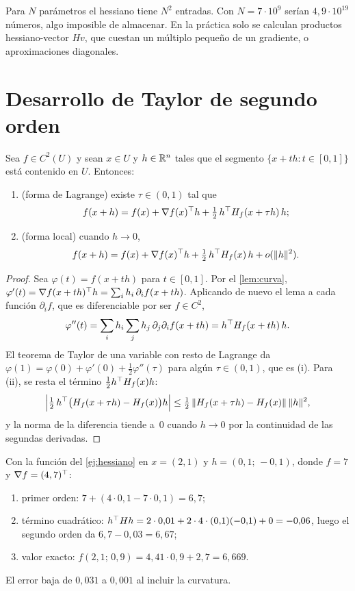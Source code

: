 \begin{observacion}
Para $N$ parámetros el hessiano tiene $N^{2}$ entradas. Con $N=7\cdot 10^{9}$ serían $4{,}9\cdot 10^{19}$ números, algo imposible de almacenar. En la práctica solo se calculan productos hessiano-vector $H v$, que cuestan un múltiplo pequeño de un gradiente, o aproximaciones diagonales.
\end{observacion}

\section{Desarrollo de Taylor de segundo orden}

\begin{teorema}\label{teo:taylor}
Sea $f\in C^{2}(U)$ y sean $x\in U$ y $h\in\mathbb{R}^{n}$ tales que el segmento $\{x+th:t\in[0,1]\}$ está contenido en $U$. Entonces:
\begin{enumerate}
  \item (forma de Lagrange) existe $\tau\in(0,1)$ tal que
  \[
  f(x+h)=f(x)+\nabla f(x)^{\top} h+\tfrac12\,h^{\top} H_f(x+\tau h)\,h;
  \]
  \item (forma local) cuando $h\to 0$,
  \[
  f(x+h)=f(x)+\nabla f(x)^{\top} h+\tfrac12\,h^{\top} H_f(x)\,h+o(\lVert h\rVert^{2}).
  \]
\end{enumerate}
\end{teorema}

\begin{proof}
Sea $\varphi(t)=f(x+th)$ para $t\in[0,1]$. Por el \cref{lem:curva}, $\varphi'(t)=\nabla f(x+th)^{\top} h=\sum_i h_i\,\partial_i f(x+th)$. Aplicando de nuevo el lema a cada función $\partial_i f$, que es diferenciable por ser $f\in C^{2}$,
\[
\varphi''(t)=\sum_{i}h_i\sum_{j}h_j\,\partial_j\partial_i f(x+th)=h^{\top} H_f(x+th)\,h.
\]
El teorema de Taylor de una variable con resto de Lagrange da $\varphi(1)=\varphi(0)+\varphi'(0)+\tfrac12\varphi''(\tau)$ para algún $\tau\in(0,1)$, que es (i). Para (ii), se resta el término $\tfrac12 h^{\top} H_f(x)h$:
\[
\Bigl|\tfrac12\,h^{\top}\bigl(H_f(x+\tau h)-H_f(x)\bigr)h\Bigr|\le\tfrac12\,\lVert H_f(x+\tau h)-H_f(x)\rVert\,\lVert h\rVert^{2},
\]
y la norma de la diferencia tiende a~0 cuando $h\to 0$ por la continuidad de las segundas derivadas.
\end{proof}

\begin{ejemplo}\label{ej:taylor}
Con la función del \cref{ej:hessiano} en $x=(2,1)$ y $h=(0{,}1;\,-0{,}1)$, donde $f=7$ y $\nabla f=(4,7)^{\top}$:
\begin{enumerate}[label=\arabic*.]
  \item primer orden: $7+(4\cdot 0{,}1-7\cdot 0{,}1)=6{,}7$;
  \item término cuadrático: $h^{\top} Hh=2\cdot 0{,}01+2\cdot 4\cdot(0{,}1)(-0{,}1)+0=-0{,}06$, luego el segundo orden da $6{,}7-0{,}03=6{,}67$;
  \item valor exacto: $f(2{,}1;\,0{,}9)=4{,}41\cdot 0{,}9+2{,}7=6{,}669$.
\end{enumerate}
El error baja de $0{,}031$ a $0{,}001$ al incluir la curvatura.
\end{ejemplo}

